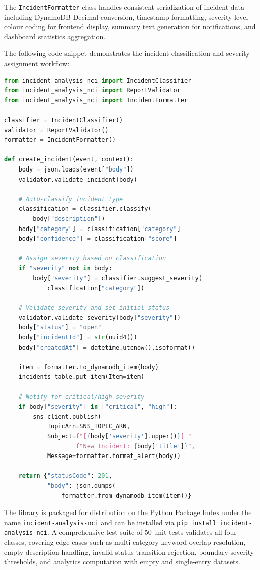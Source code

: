 \documentclass[conference]{IEEEtran}
\begin{document}
The \texttt{IncidentFormatter} class handles consistent serialization of incident data including DynamoDB Decimal conversion, timestamp formatting, severity level colour coding for frontend display, summary text generation for notifications, and dashboard statistics aggregation.

The following code snippet demonstrates the incident classification and severity assignment workflow:

\begin{lstlisting}[language=Python, caption={Incident classification using the library}]
from incident_analysis_nci import IncidentClassifier
from incident_analysis_nci import ReportValidator
from incident_analysis_nci import IncidentFormatter

classifier = IncidentClassifier()
validator = ReportValidator()
formatter = IncidentFormatter()

def create_incident(event, context):
    body = json.loads(event["body"])
    validator.validate_incident(body)

    # Auto-classify incident type
    classification = classifier.classify(
        body["description"])
    body["category"] = classification["category"]
    body["confidence"] = classification["score"]

    # Assign severity based on classification
    if "severity" not in body:
        body["severity"] = classifier.suggest_severity(
            classification["category"])

    # Validate severity and set initial status
    validator.validate_severity(body["severity"])
    body["status"] = "open"
    body["incidentId"] = str(uuid4())
    body["createdAt"] = datetime.utcnow().isoformat()

    item = formatter.to_dynamodb_item(body)
    incidents_table.put_item(Item=item)

    # Notify for critical/high severity
    if body["severity"] in ["critical", "high"]:
        sns_client.publish(
            TopicArn=SNS_TOPIC_ARN,
            Subject=f"[{body['severity'].upper()}] "
                    f"New Incident: {body['title']}",
            Message=formatter.format_alert(body))

    return {"statusCode": 201,
            "body": json.dumps(
                formatter.from_dynamodb_item(item))}
\end{lstlisting}

The library is packaged for distribution on the Python Package Index under the name \texttt{incident-analysis-nci} and can be installed via \texttt{pip install incident-analysis-nci}. A comprehensive test suite of 50 unit tests validates all four classes, covering edge cases such as multi-category keyword overlap resolution, empty description handling, invalid status transition rejection, boundary severity thresholds, and analytics computation with empty and single-entry datasets.
\end{document}
